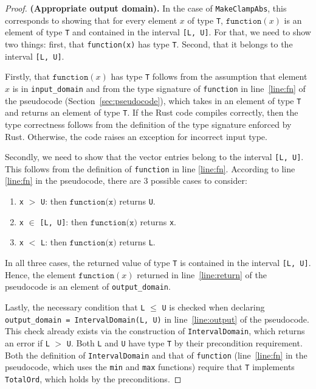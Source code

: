 \documentclass[11pt,a4paper]{article}
\theoremstyle{definition}
\newcommand{\T}{\texttt{T} }
\newcommand{\function}{\texttt{function}}
\begin{document}
\begin{proof}
\textbf{(Appropriate output domain).} In the case of \texttt{MakeClampAbs}, this corresponds to showing that for every element $x$ of type \texttt{T}, $\function(x)$ is an element of type \texttt{T} and contained in the interval \texttt{[L, U]}. For that, we need to show two things: first, that \texttt{function(x)} has type \texttt{T}. Second, that it belongs to the interval \texttt{[L, U]}.

Firstly, that $\function(x)$ has type \texttt{T} follows from the assumption that element $x$ is in \texttt{input\_domain} and from the type signature of \texttt{function} in line~\ref{line:fn} of the pseudocode (Section~\ref{sec:pseudocode}), which takes in an element of type \texttt{T} and returns an element of type \texttt{T}. If the Rust code compiles correctly, then the type correctness follows from the definition of the type signature enforced by Rust. Otherwise, the code raises an exception for incorrect input type. 

Secondly, we need to show that the vector entries belong to the interval \texttt{[L, U]}. This follows from the definition of \texttt{function} in line \ref{line:fn}. According to line \ref{line:fn} in the pseudocode, there are 3 possible cases to consider:
\begin{enumerate}
    \item \texttt{x} $>$ \texttt{U}: then $\texttt{function(x)}$ returns \texttt{U}.
    \item \texttt{x} $\in$ \texttt{[L, U]}: then $\texttt{function(x)}$ returns \texttt{x}.
    \item \texttt{x} $<$ \texttt{L}: then $\texttt{function(x)}$ returns \texttt{L}.
\end{enumerate}
In all three cases, the returned value of type \T is contained in the interval \texttt{[L, U]}. Hence, the element $\function(x)$ returned in line~\ref{line:return} of the pseudocode is an element of \texttt{output\_domain}.

Lastly, the necessary condition that \texttt{L} $\leq$ \texttt{U} is checked when declaring \texttt{output\_domain = IntervalDomain(L, U)} in line~\ref{line:output} of the pseudocode. This check already exists via the construction of \texttt{IntervalDomain}, which returns an error if \texttt{L} $>$ \texttt{U}. Both \texttt{L} and \texttt{U} have type \texttt{T} by their precondition requirement. Both the definition of \texttt{IntervalDomain} and that of \texttt{function} (line~\ref{line:fn} in the pseudocode, which uses the \texttt{min} and \texttt{max} functions) require that \texttt{T} implements \texttt{TotalOrd}, which holds by the preconditions.


\end{proof}
\end{document}
